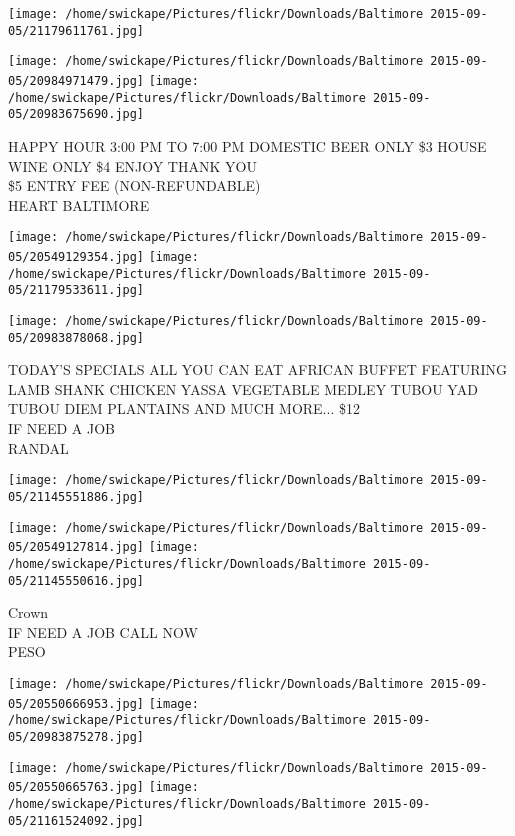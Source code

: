 \documentclass[10pt,letterpaper]{article}
\begin{document}
\texttt{[image: /home/swickape/Pictures/flickr/Downloads/Baltimore 2015-09-05/21179611761.jpg]}

\vspace{0.25in}
\texttt{[image: /home/swickape/Pictures/flickr/Downloads/Baltimore 2015-09-05/20984971479.jpg]}
\texttt{[image: /home/swickape/Pictures/flickr/Downloads/Baltimore 2015-09-05/20983675690.jpg]}

HAPPY HOUR 3:00 PM TO 7:00 PM DOMESTIC BEER ONLY \$3 HOUSE WINE ONLY \$4 ENJOY THANK YOU\\
\$5 ENTRY FEE (NON{-}REFUNDABLE)\\
HEART BALTIMORE\\
\pagebreak

\texttt{[image: /home/swickape/Pictures/flickr/Downloads/Baltimore 2015-09-05/20549129354.jpg]}
\texttt{[image: /home/swickape/Pictures/flickr/Downloads/Baltimore 2015-09-05/21179533611.jpg]}

\vspace{0.25in}
\texttt{[image: /home/swickape/Pictures/flickr/Downloads/Baltimore 2015-09-05/20983878068.jpg]}

TODAY'S SPECIALS ALL YOU CAN EAT AFRICAN BUFFET FEATURING LAMB SHANK CHICKEN YASSA VEGETABLE MEDLEY TUBOU YAD TUBOU DIEM PLANTAINS AND MUCH MORE... \$12\\
IF NEED A JOB\\
RANDAL\\
\pagebreak

\texttt{[image: /home/swickape/Pictures/flickr/Downloads/Baltimore 2015-09-05/21145551886.jpg]}

\vspace{0.25in}
\texttt{[image: /home/swickape/Pictures/flickr/Downloads/Baltimore 2015-09-05/20549127814.jpg]}
\texttt{[image: /home/swickape/Pictures/flickr/Downloads/Baltimore 2015-09-05/21145550616.jpg]}

Crown\\
IF NEED A JOB CALL NOW\\
PESO\\
\pagebreak

\texttt{[image: /home/swickape/Pictures/flickr/Downloads/Baltimore 2015-09-05/20550666953.jpg]}
\texttt{[image: /home/swickape/Pictures/flickr/Downloads/Baltimore 2015-09-05/20983875278.jpg]}

\texttt{[image: /home/swickape/Pictures/flickr/Downloads/Baltimore 2015-09-05/20550665763.jpg]}
\texttt{[image: /home/swickape/Pictures/flickr/Downloads/Baltimore 2015-09-05/21161524092.jpg]}
\end{document}
